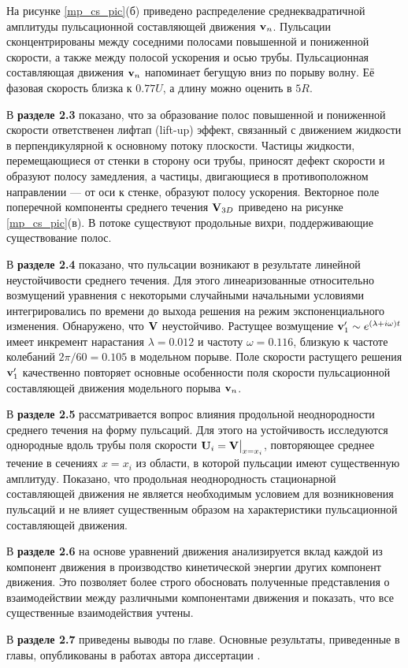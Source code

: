 На рисунке \ref{mp_cs_pic}(б) приведено распределение среднеквадратичной амплитуды пульсационной составляющей движения $\mathbf{v}_n$. Пульсации сконцентрированы между соседними полосами повышенной и пониженной скорости, а также между полосой ускорения и осью трубы. Пульсационная составляющая движения $\mathbf{v}_n$ напоминает бегущую вниз по порыву волну. Её фазовая скорость близка к $0.77U$, а длину можно оценить в $5R$. 

В \textbf{разделе 2.3} показано, что за образование полос повышенной и пониженной скорости ответственен лифтап (lift-up) эффект, связанный с движением жидкости в перпендикулярной к основному потоку плоскости. Частицы жидкости, перемещающиеся от стенки в сторону оси трубы, приносят дефект скорости и образуют полосу замедления, а частицы, двигающиеся в противоположном направлении --- от оси к стенке, образуют полосу ускорения.
Векторное поле поперечной компоненты среднего течения $\mathbf{V}_{3D}$ приведено на рисунке \ref{mp_cs_pic}(в). В потоке существуют продольные вихри, поддерживающие существование полос. 

В \textbf{разделе 2.4} показано, что пульсации возникают в результате линейной неустойчивости среднего течения. Для этого линеаризованные относительно возмущений уравнения с некоторыми случайными начальными условиями интегрировались по времени до выхода решения на режим экспоненциального изменения. Обнаружено, что $\mathbf{V}$ неустойчиво. Растущее возмущение $\mathbf{v}'_1 \sim e^{(\lambda+i\omega)t}$ имеет инкремент нарастания $\lambda=0.012$ и частоту $\omega=0.116$, близкую к частоте колебаний $2\pi/60=0.105$ в модельном порыве. Поле скорости растущего решения $\mathbf{v}'_1$ качественно повторяет основные особенности поля скорости пульсационной составляющей движения модельного порыва $\mathbf{v}_n$. 

В \textbf{разделе 2.5} рассматривается вопрос влияния продольной неоднородности среднего течения на форму пульсаций. Для этого на устойчивость исследуются однородные вдоль трубы поля скорости $\mathbf{U}_i = \mathbf{V}\big|_{x=x_i}$, повторяющее среднее течение в сечениях $x = x_i$ из области, в которой пульсации имеют существенную амплитуду. Показано, что продольная неоднородность стационарной составляющей движения не является необходимым условием для возникновения пульсаций и не влияет существенным образом на характеристики пульсационной составляющей движения. 

В \textbf{разделе 2.6} на основе уравнений движения анализируется вклад каждой из компонент движения в производство кинетической энергии других компонент движения. Это позволяет более строго обосновать полученные представления о взаимодействии между различными компонентами движения и показать, что все существенные взаимодействия учтены. %

В \textbf{разделе 2.7} приведены выводы по главе. Основные результаты, приведенные в главы, опубликованы в работах автора диссертации \cite{MZG2015, Kazan2015, KMU2015}.


